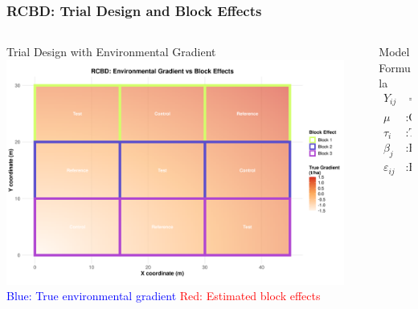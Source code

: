 \documentclass[aspectratio=43]{beamer}
\begin{document}
\begin{frame}
    \frametitle{RCBD: Trial Design and Block Effects}
    \begin{columns}[T]
        \begin{column}{0.55\textwidth}
            \begin{block}{Trial Design with Environmental Gradient}
                \centering
                \includegraphics[width=0.95\textwidth]{Imgs/rcbd_trial_design_blocks.png}
                \vspace{0.5em}
                \scriptsize
                \textcolor{blue}{Blue: True environmental gradient}
                \textcolor{red}{Red: Estimated block effects}
            \end{block}
        \end{column}
        \begin{column}{0.45\textwidth}
            \begin{block}{Model Formula}
                \vspace{0.5em}
                \begin{align*}
                    Y_{ij} &= \mu + \tau_i + \beta_j + \varepsilon_{ij} \\
                    \mu &: \text{Overall mean} \\
                    \tau_i &: \text{Treatment effect} \\
                    \beta_j &: \text{Block effect} \\
                    \varepsilon_{ij} &: \text{Random error}
                \end{align*}
            \end{block}
        \end{column}
    \end{columns}
\end{frame}
\end{document}

